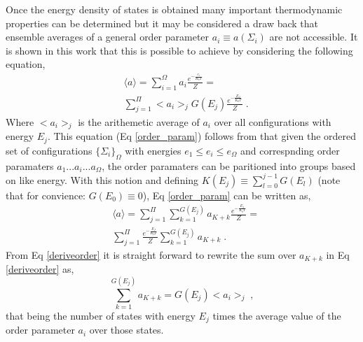 \documentclass[aps,prl,reprint,superscriptaddress,showkeys]{revtex4-1}
\begin{document}
 Once the energy density of states is obtained many important thermodynamic properties can be determined but it may be considered a draw back that ensemble averages of a general order parameter $a_i \equiv a(\Sigma_i)$ are not accessible.  It is shown in this work that this is possible to achieve by considering the following equation, 
\begin{equation}
\begin{split}
&\langle a \rangle = \sum_{i=1}^{\Omega}a_i \frac{ e^{- \frac{e_i}{K_bT}  }}{Z} = \\
&\sum_{j=1}^{\Pi}<a_i>_{j}G(E_j)\frac{e^{-\frac{E_J}{K_bT} }}{Z} \; . 
\label{order_param}
\end{split} 
\end{equation}
Where $<a_i>_{j}$ is the arithemetic average of $a_i$ over all configurations with energy $E_j$. This equation (Eq \ref{order_param}) follows from that given the ordered set of configurations $\{\Sigma_i\}_\Omega$ with energies $e_1 \leq e_i \leq e_\Omega$ and correspnding order paramaters $a_1 ... a_i ... a_\Omega$, the order paramaters can be paritioned into groups based on like energy. With this notion and defining  $K(E_j)\equiv \sum_{l=0}^{j-1}G(E_l)$ (note that for convience: $G(E_0)\equiv 0$), Eq \ref{order_param} can be written as,
\begin{equation}
\begin{split}
&\langle a \rangle =  \sum_{j=1}^{\Pi} \sum_{k=1}^{G(E_j)}a_{K+k} \frac{e^{-\frac{E_J}{K_bT} }}{Z} = \\
&   \sum_{j=1}^{\Pi} \frac{e^{-\frac{E_J}{K_bT} }}{Z} \sum_{k=1}^{G(E_j)}a_{K+k} \;. 
\end{split}
\label{deriveorder}
\end{equation}
From Eq \ref{deriveorder}  it is straight forward to rewrite the sum over $a_{K+k}$ in Eq \ref{deriveorder} as, 
\begin{equation}
\sum_{k=1}^{G(E_j)}a_{K+k} =  G(E_j)<a_i>_{j} \;, 
\end{equation}
that being the number of states with energy $E_j$ times the average value of the order parameter  $a_i$ over those states. 
\end{document}
